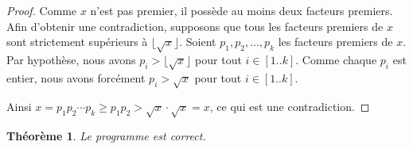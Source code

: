 \documentclass{article}
\newtheorem{theorem}{Théorème}
\begin{document}
\begin{proof}
  Comme $x$ n'est pas premier, il possède au moins deux facteurs
  premiers. Afin d'obtenir une contradiction, supposons que tous les
  facteurs premiers de $x$ sont strictement supérieurs à
  $\lfloor\sqrt{x}\rfloor$. Soient $p_1, p_2, \ldots, p_k$ les
  facteurs premiers de $x$. Par hypothèse, nous avons $p_i > \lfloor
  \sqrt{x} \rfloor$ pour tout $i \in [1..k]$. Comme chaque $p_i$ est
  entier, nous avons forcément $p_i > \sqrt{x}$ pour tout $i \in
  [1..k]$.

  Ainsi $x = p_1 p_2 \cdots p_k \geq p_1 p_2 > \sqrt{x} \cdot \sqrt{x}
  = x$, ce qui est une contradiction.
\end{proof}

\begin{theorem}
  Le programme est correct.
\end{theorem}
\end{document}
